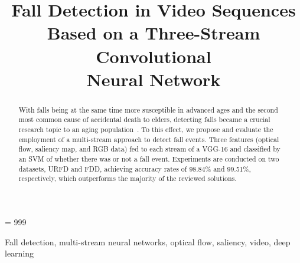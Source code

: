 \documentclass[conference]{IEEEtran}
\begin{document}
\sloppy
\tolerance = 999

\title{Fall Detection in Video Sequences \\ Based on a Three-Stream Convolutional \\ Neural Network}

\author{\vspace*{0.0cm}}


\maketitle

\begin{abstract}
With falls being at the same time more susceptible in advanced ages and the second most common cause of accidental death to elders, detecting falls became a crucial research topic to an aging population~\cite{who2007report}. To this effect, we propose and evaluate the employment of a multi-stream approach to detect fall events. Three features (optical flow, saliency map, and RGB data) fed to each stream of a VGG-16 and classified by an SVM of whether there was or not a fall event. Experiments are conducted on two datasets, URFD and FDD, achieving accuracy rates of 98.84\% and 99.51\%, respectively, which outperforms the majority of the reviewed solutions.
\end{abstract}

\begin{IEEEkeywords}
Fall detection, multi-stream neural networks, optical flow, saliency, video, deep learning
\end{IEEEkeywords}
\end{document}
